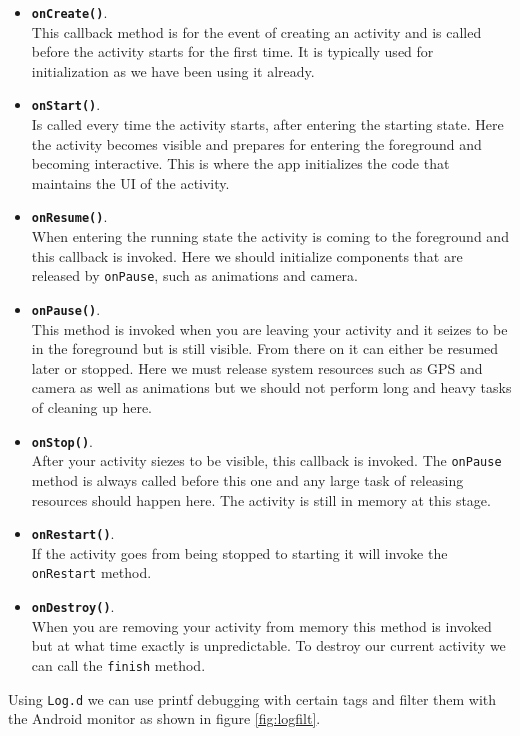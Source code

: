 \begin{itemize}
	\item \textbf{\texttt{onCreate()}}.\\
    \noindent This callback method is for the event of creating an activity and is called before the activity starts for the first time. It is typically used for initialization as we have been using it already.
	\item \textbf{\texttt{onStart()}}.\\
    \noindent Is called every time the activity starts, after entering the starting state. Here the activity becomes visible and prepares for entering the foreground and becoming interactive. This is where the app initializes the code that maintains the UI of the activity.
	\item \textbf{\texttt{onResume()}}.\\
    \noindent When entering the running state the activity is coming to the foreground and this callback is invoked. Here we should initialize components that are released by \texttt{onPause}, such as animations and camera.
	\item \textbf{\texttt{onPause()}}.\\
    \noindent This method is invoked when you are leaving your activity and it seizes to be in the foreground but is still visible. From there on it can either be resumed later or stopped. Here we must release system resources such as GPS and camera as well as animations but we should not perform long and heavy tasks of cleaning up here.
	\item \textbf{\texttt{onStop()}}.\\
    \noindent After your activity siezes to be visible, this callback is invoked. The \texttt{onPause} method is always called before this one and any large task of releasing resources should happen here. The activity is still in memory at this stage.
	\item \textbf{\texttt{onRestart()}}.\\
    \noindent If the activity goes from being stopped to starting it will invoke the \texttt{onRestart} method.
	\item \textbf{\texttt{onDestroy()}}.\\
    \noindent When you are removing your activity from memory this method is invoked but at what time exactly is unpredictable. To destroy our current activity we can call the \texttt{finish} method.
\end{itemize}

Using \texttt{Log.d} we can use printf debugging with certain tags and filter them with the Android monitor as shown in figure \ref{fig:logfilt}. 

